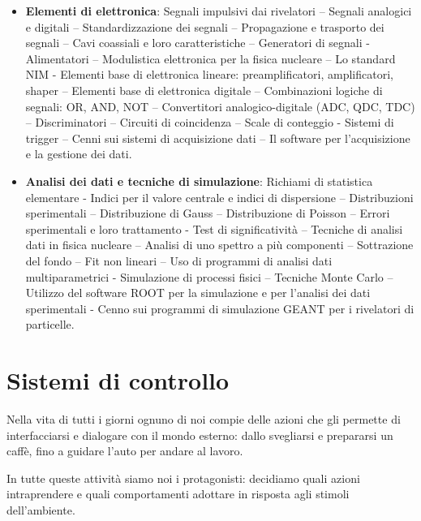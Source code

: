 \documentclass[12pt, letterpaper]{book}
\begin{document}
\begin{itemize}
    \item[3] \textbf{Elementi di elettronica}: Segnali impulsivi dai rivelatori – Segnali analogici e digitali – Standardizzazione dei segnali – Propagazione e trasporto dei segnali – Cavi coassiali e loro caratteristiche – Generatori di segnali - Alimentatori – Modulistica elettronica per la fisica nucleare – Lo standard NIM - Elementi base di elettronica lineare: preamplificatori, amplificatori, shaper – Elementi base di elettronica digitale – Combinazioni logiche di segnali: OR, AND, NOT – Convertitori analogico-digitale (ADC, QDC, TDC) – Discriminatori – Circuiti di coincidenza – Scale di conteggio - Sistemi di trigger – Cenni sui sistemi di acquisizione dati – Il software per l’acquisizione e la gestione dei dati.
    \item[4] \textbf{Analisi dei dati e tecniche di simulazione}: Richiami di statistica elementare - Indici per il valore centrale e indici di dispersione – Distribuzioni sperimentali – Distribuzione di Gauss – Distribuzione di Poisson – Errori sperimentali e loro trattamento - Test di significatività – Tecniche di analisi dati in fisica nucleare – Analisi di uno spettro a più componenti – Sottrazione del fondo – Fit non lineari – Uso di programmi di analisi dati multiparametrici - Simulazione di processi fisici – Tecniche Monte Carlo – Utilizzo del software ROOT per la simulazione e per l’analisi dei dati sperimentali - Cenno sui programmi di simulazione GEANT per i rivelatori di particelle.
\end{itemize}
\newpage
\tableofcontents
\newpage
\mainmatter


\chapter{Sistemi di controllo}

Nella vita di tutti i giorni ognuno di noi compie delle azioni che gli permette di interfacciarsi e dialogare con il mondo esterno: dallo svegliarsi e prepararsi un caffè, fino a guidare l'auto per andare al lavoro.

In tutte queste attività siamo noi i protagonisti: decidiamo quali azioni intraprendere e quali comportamenti adottare in risposta agli stimoli dell'ambiente.
\end{document}
